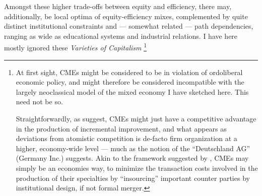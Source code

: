 \begin{enumerate}
	Amongst these higher trade-offs between equity and efficiency, there may, additionally, be local optima of equity-efficiency mixes, complemented by quite distinct institutional constraints and --- somewhat related --- path dependencies, ranging as wide as educational systems and industrial relations. I have here mostly ignored these \emph{Varieties of Capitalism} \citep{HallSoskice-2001-aa}\footnote{
		At first sight, \glspl{CME} might be considered to be in violation of ordoliberal economic policy, and might therefore be considered incompatible with the largely neoclassical model of the mixed economy I have sketched here. This need not be so.

		Straightforwardly, as \citeauthor{HallSoskice-2001-aa} suggest, \glspl{CME} might just have a competitive advantage in the production of incremental improvement, and what appears as deviations from atomistic competition is de-facto firm organization at a higher, economy-wide level --- much as the notion of the ``Deutschland AG'' (Germany Inc.) suggests. Akin to the framework suggested by \cite{Hart1990}, \glspl{CME} may simply be an economies way, to minimize the transaction costs involved in the production of their specialties by ``insourcing'' important counter parties by institutional design, if not formal merger.

}
\end{enumerate}
